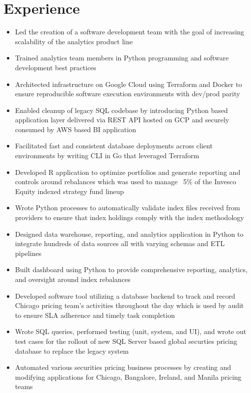 \documentclass[11pt,a4paper,sans]{moderncv}
\begin{document}
	\makecvtitle

	\section{Experience}
	\begin{itemize}
		\item Led the creation of a software development team with the goal of increasing scalability of the analytics product line
		\item Trained analytics team members in Python programming and software development best practices
		\item Architected infrastructure on Google Cloud using Terraform and Docker to ensure reproducible software execution environments with dev/prod parity
		\item Enabled cleanup of legacy SQL codebase by introducing Python based application layer delivered via REST API hosted on GCP and securely consumed by AWS based BI application
		\item Facilitated fast and consistent database deployments across client environments by writing CLI in Go that leveraged Terraform
	\end{itemize}
	\vspace{5mm}

	\begin{itemize}
		\item Developed R application to optimize portfolios and generate reporting and controls around rebalances which was used to manage ~5\% of the Invesco Equity indexed strategy fund lineup
		\item Wrote Python processes to automatically validate index files received from providers to ensure that index holdings comply with the index methodology
		\item Designed data warehouse, reporting, and analytics application in Python to integrate hundreds of data sources all with varying schemas and ETL pipelines
		\item Built dashboard using Python to provide comprehensive reporting, analytics, and oversight around index rebalances
	\end{itemize}
	\vspace{5mm}
	\begin{itemize}
		\item Developed software tool utilizing a database backend to track and record Chicago pricing team's activities throughout the day which is used by audit to ensure SLA adherence and timely task completion
		\item Wrote SQL queries, performed testing (unit, system, and UI), and wrote out test cases for the rollout of new SQL Server based global securties pricing database to replace the legacy system
		\item Automated various securities pricing business processes by creating and modifying applications for Chicago, Bangalore, Ireland, and Manila pricing teams
	\end{itemize}
\end{document}
